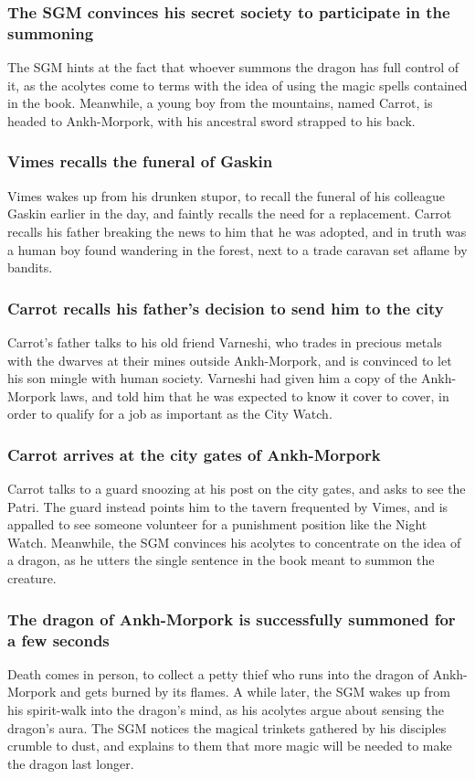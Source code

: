 \subsubsection{The \Gls{SGM} convinces his secret society to participate in the summoning}
The \Gls{SGM} hints at the fact that whoever summons the dragon has full control of it, as the
acolytes come to terms with the idea of using the magic spells contained in the book. Meanwhile,
a young boy from the mountains, named \Gls{Carrot}, is headed to Ankh-Morpork, with his ancestral
sword strapped to his back.

\subsubsection{\Gls{Vimes} recalls the funeral of \Gls{Gaskin}}
\Gls{Vimes} wakes up from his drunken stupor, to recall the funeral of his colleague \Gls{Gaskin}
earlier in the day, and faintly recalls the need for a replacement. \Gls{Carrot} recalls his father
breaking the news to him that he was adopted, and in truth was a human boy found wandering in the
forest, next to a trade caravan set aflame by bandits.

\subsubsection{\Gls{Carrot} recalls his father's decision to send him to the city}
\Gls{Carrot}'s father talks to his old friend \Gls{Varneshi}, who trades in precious metals with the
dwarves at their mines outside Ankh-Morpork, and is convinced to let his son mingle with human
society. \Gls{Varneshi} had given him a copy of the Ankh-Morpork laws, and told him that he was
expected to know it cover to cover, in order to qualify for a job as important as the City Watch.

\subsubsection{\Gls{Carrot} arrives at the city gates of Ankh-Morpork}
\Gls{Carrot} talks to a guard snoozing at his post on the city gates, and asks to see the
\Gls{Patri}. The guard instead points him to the tavern frequented by \Gls{Vimes}, and is appalled
to see someone volunteer for a punishment position like the Night Watch. Meanwhile, the \Gls{SGM}
convinces his acolytes to concentrate on the idea of a dragon, as he utters the single sentence
in the book meant to summon the creature.

\subsubsection{The dragon of Ankh-Morpork is successfully summoned for a few seconds}
\Gls{Death} comes in person, to collect a petty thief who runs into the dragon of Ankh-Morpork and
gets burned by its flames. A while later, the \Gls{SGM} wakes up from his spirit-walk into the
dragon's mind, as his acolytes argue about sensing the dragon's aura. The \Gls{SGM} notices the
magical trinkets gathered by his disciples crumble to dust, and explains to them that more magic
will be needed to make the dragon last longer.

